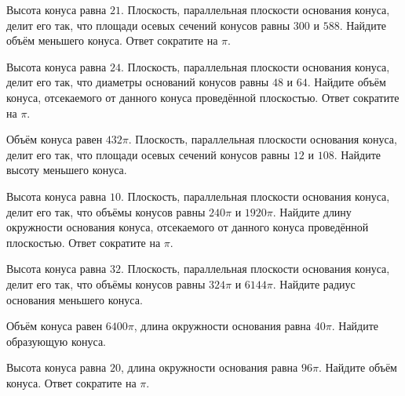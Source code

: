 \documentclass[a4paper]{article}
\begin{document}
\begin{taskBN}{62}
Высота конуса равна $21$. Плоскость, параллельная плоскости основания конуса,  делит его так, что площади осевых сечений конусов равны $300$ и $588$. Найдите объём меньшего конуса. Ответ сократите на $\pi$.
\end{taskBN}

\begin{taskBN}{63}
Высота конуса равна $24$. Плоскость, параллельная плоскости основания конуса,  делит его так, что диаметры оснований конусов равны $48$ и $64$. Найдите объём конуса, отсекаемого от данного конуса проведённой плоскостью. Ответ сократите на $\pi$.
\end{taskBN}

\begin{taskBN}{64}
Объём конуса равен $432\pi$. Плоскость, параллельная плоскости основания конуса,  делит его так, что площади осевых сечений конусов равны $12$ и $108$. Найдите высоту меньшего конуса. 
\end{taskBN}

\begin{taskBN}{65}
Высота конуса равна $10$. Плоскость, параллельная плоскости основания конуса,  делит его так, что объёмы конусов равны $240\pi$ и $1920\pi$. Найдите длину окружности основания конуса, отсекаемого от данного конуса проведённой плоскостью. Ответ сократите на $\pi$.
\end{taskBN}

\begin{taskBN}{66}
Высота конуса равна $32$. Плоскость, параллельная плоскости основания конуса,  делит его так, что объёмы конусов равны $324\pi$ и $6144\pi$. Найдите радиус основания меньшего конуса. 
\end{taskBN}

\begin{taskBN}{67}
Объём конуса равен $6400\pi$, длина окружности основания равна $40\pi$. Найдите образующую конуса. 
\end{taskBN}

\begin{taskBN}{68}
Высота конуса равна $20$, длина окружности основания равна $96\pi$. Найдите объём конуса. Ответ сократите на $\pi$.
\end{taskBN}
\end{document}
